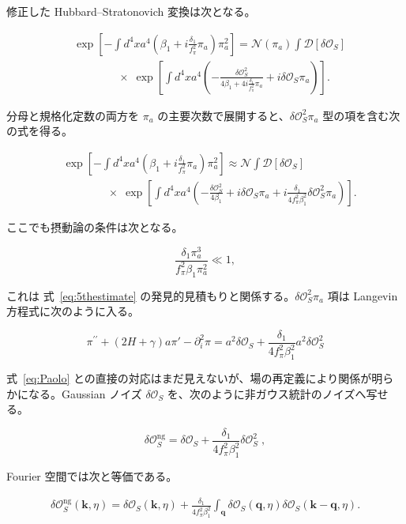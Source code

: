 \documentclass[a4paper,11pt]{ltjsarticle}
\numberwithin{equation}{section}
\def\pia{\pi_{a}}
\def\bfk{\textbf{k}}
\def\bfq{\textbf{q}}
\newcommand{\Os}{\delta \mathcal{O}_{S}}
\newcommand{\Eq}[1]{Eq.~(\ref{#1})}
\renewcommand{\Eq}[1]{式~\eqref{#1}}
\begin{document}
修正した Hubbard--Stratonovich 変換は次となる。

\begin{align}
&\exp\left[-\int d^{4}x a^{4}\left(\beta_{1}+i \frac{\delta_1}{f_\pi^2}\pia\right)\pia^{2}\right]=\mathcal{N}(\pia)\int\mathcal{D}[\Os] \\
& \qquad \qquad \times \;\exp\left[\int d^{4}x a^{4}\left(-\frac{\Os^{2}}{4\beta_{1}+4i \frac{\delta_1}{f_\pi^2}\pia}+i\Os\pia\right)\right].\nonumber
\end{align}

分母と規格化定数の両方を $\pia$ の主要次数で展開すると、$\Os^2\pia$ 型の項を含む次の式を得る。

\begin{align}
&\exp\left[-\int d^{4}x a^{4}\left(\beta_{1}+i \frac{\delta_1}{f_\pi^2}\pia\right)\pia^{2}\right]\approx\mathcal{N}\int\mathcal{D}[\Os] \\
&\qquad \qquad \times \;\exp\left[\int d^{4}x a^{4}\left(-\frac{\Os^{2}}{4\beta_{1}} + i\Os\pia + i\frac{\delta_{1}}{4f_\pi^2\beta_{1}^{2}} \Os^2 \pia\right) \right]. \nonumber 
\end{align}

ここでも摂動論の条件は次となる。

\begin{equation}
\frac{\delta_{1}\pia^3}{f_{\pi}^{2}\beta_{1} \pia^2}\ll 1,
\end{equation}

これは \Eq{eq:5thestimate} の発見的見積もりと関係する。$\Os^2\pia$ 項は Langevin 方程式に次のように入る。

\begin{equation}
\pi^{\prime \prime}+\left( 2H + \gamma\right)a\pi'-\partial_{i}^{2}\pi=a^2 \Os+ \frac{ \delta_{1}}{4f_\pi^2\beta_{1}^{2}} a^2 \Os^{2}
\end{equation}

\Eq{eq:Paolo} との直接の対応はまだ見えないが、場の再定義により関係が明らかになる。Gaussian ノイズ $\Os$ を、次のように非ガウス統計のノイズへ写せる。

\begin{equation}
\Os^{\text{ng}}=\Os+\frac{\delta_{1}}{4f_\pi^2\beta_{1}^{2}}\Os^{2}\;,
\end{equation}

Fourier 空間では次と等価である。

\begin{align}
\delta\mathcal{O}_{S}^{\text{ng}}(\bfk, \eta)=\delta\mathcal{O}_{S}(\bfk,\eta)+\frac{\delta_{1}}{4f_\pi^2\beta_{1}^{2}}\int_{\bfq}\delta\mathcal{O}_{S}(\bfq, \eta)\delta\mathcal{O}_{S}(\bfk-\bfq, \eta).
\end{align}
\end{document}
